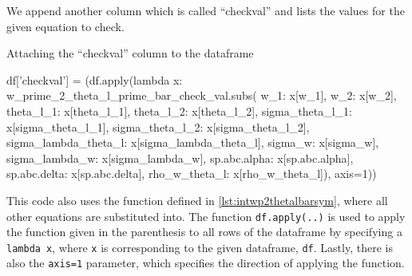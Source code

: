 We append another column which is called \enquote{checkval}
and lists the values for the given equation to check.
\begin{listing}[!ht]
    \caption{Attaching the \enquote{checkval} column to the dataframe}
    \label{lst:attachcheckvaltodataframe}
    \begin{pythoncode}
        df['checkval'] = (df.apply(lambda x: w_prime_2_theta_l_prime_bar_check_val.subs({
                 w_1: x[w_1], w_2: x[w_2], theta_l_1: x[theta_l_1], theta_l_2: x[theta_l_2],
                 sigma_theta_l_1: x[sigma_theta_l_1], sigma_theta_l_2: x[sigma_theta_l_2],
                 sigma_lambda_theta_l: x[sigma_lambda_theta_l], sigma_w: x[sigma_w],
                 sigma_lambda_w: x[sigma_lambda_w], sp.abc.alpha: x[sp.abc.alpha],
                 sp.abc.delta: x[sp.abc.delta], rho_w_theta_l: x[rho_w_theta_l]}), axis=1))
    \end{pythoncode}
\end{listing}
This code also uses the function defined in \cref{lst:intwp2thetalbarsym},
where all other equations are substituted into.
The function \texttt{df.apply(..)} is used
to apply the function given in the parenthesis to all rows of the dataframe
by specifying a \texttt{lambda x},
where \texttt{x} is corresponding to the given dataframe, \texttt{df}.
Lastly, there is also the \texttt{axis=1} parameter,
which specifies the direction of applying the function.

